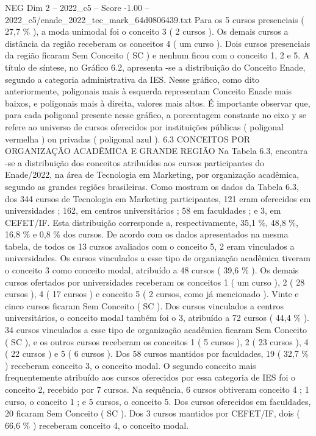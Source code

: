 \begin{textsample}{NEG Dim 2 – 2022\_c5 – Score -1.00 – 2022\_c5/enade\_2022\_tec\_mark\_64d0806439.txt}
Para os 5 cursos presenciais ( 27,7 \% ), a moda unimodal foi o conceito 3 ( 2 cursos ).
Os demais cursos a distância da região receberam os conceitos 4 ( um curso ).
Dois cursos presenciais da região ficaram Sem Conceito ( SC ) e nenhum ficou com o conceito 1, 2 e 5.
A título de síntese, no Gráfico 6.2, apresenta -se a distribuição do Conceito Enade, segundo a categoria administrativa da IES.
Nesse gráfico, como dito anteriormente, poligonais mais à esquerda representam Conceito Enade mais baixos, e poligonais mais à direita, valores mais altos.
É importante observar que, para cada poligonal presente nesse gráfico, a porcentagem constante no eixo y se refere ao universo de cursos oferecidos por instituições públicas ( poligonal vermelha ) ou privadas ( poligonal azul ). 6.3 CONCEITOS POR ORGANIZAÇÃO ACADÊMICA E GRANDE REGIÃO Na Tabela 6.3, encontra -se a distribuição dos conceitos atribuídos aos cursos participantes do Enade/2022, na área de Tecnologia em Marketing, por organização acadêmica, segundo as grandes regiões brasileiras.
Como mostram os dados da Tabela 6.3, dos 344 cursos de Tecnologia em Marketing participantes, 121 eram oferecidos em universidades ; 162, em centros universitários ; 58 em faculdades ; e 3, em CEFET/IF.
Esta distribuição corresponde a, respectivamente, 35,1 \%, 48,8 \%, 16,8 \% e 0,8 \% dos cursos.
De acordo com os dados apresentados na mesma tabela, de todos os 13 cursos avaliados com o conceito 5, 2 eram vinculados a universidades.
Os cursos vinculados a esse tipo de organização acadêmica tiveram o conceito 3 como conceito modal, atribuído a 48 cursos ( 39,6 \% ).
Os demais cursos ofertados por universidades receberam os conceitos 1 ( um curso ), 2 ( 28 cursos ), 4 ( 17 cursos ) e conceito 5 ( 2 cursos, como já mencionado ).
Vinte e cinco cursos ficaram Sem Conceito ( SC ).
Dos cursos vinculados a centros universitários, o conceito modal também foi o 3, atribuído a 72 cursos ( 44,4 \% ). 34 cursos vinculados a esse tipo de organização acadêmica ficaram Sem Conceito ( SC ), e os outros cursos receberam os conceitos 1 ( 5 cursos ), 2 ( 23 cursos ), 4 ( 22 cursos ) e 5 ( 6 cursos ).
Dos 58 cursos mantidos por faculdades, 19 ( 32,7 \% ) receberam conceito 3, o conceito modal.
O segundo conceito mais frequentemente atribuído aos cursos oferecidos por essa categoria de IES foi o conceito 2, recebido por 7 cursos.
Na sequência, 6 cursos obtiveram conceito 4 ; 1 curso, o conceito 1 ; e 5 cursos, o conceito 5.
Dos cursos oferecidos em faculdades, 20 ficaram Sem Conceito ( SC ).
Dos 3 cursos mantidos por CEFET/IF, dois ( 66,6 \% ) receberam conceito 4, o conceito modal.

\end{textsample}
